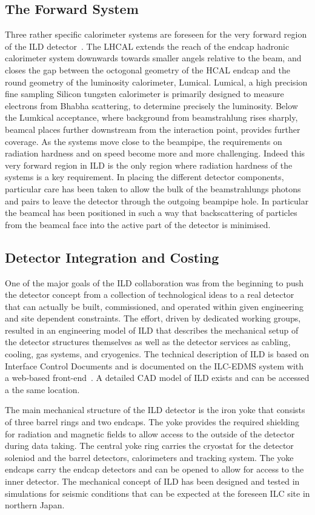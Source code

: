 \documentclass[%
 amsmath,amssymb,
 aps,
]{revtex4-1}
\begin{document}
\subsection{The Forward System}
Three rather specific calorimeter systems are foreseen for the very forward region of the ILD detector~\cite{Abramowicz:2010bg}. The LHCAL extends the reach of the endcap hadronic calorimeter system downwards towards smaller angels relative to the beam, and closes the gap between the octogonal geometry of the HCAL endcap and the round geometry of the luminosity calorimeter, Lumical. Lumical, a high precision fine sampling Silicon tungsten calorimeter is primarily designed to measure electrons from Bhabha scattering, to determine precisely the luminosity. Below the Lumkical acceptance, where background from beamstrahlung rises sharply, beamcal places further downstream from the interaction point, provides further coverage. As the systems move close to the beampipe, the requirements on radiation hardness and on speed become more and more challenging. Indeed this very forward region in ILD is the only region where radiation hardness of the systems is a key requirement. In placing the different detector components, particular care has been taken to allow the bulk of the beamstrahlungs photons and pairs to leave the detector through the outgoing beampipe hole. In particular the beamcal has been positioned in such a way that backscattering of particles from the beamcal face into the active part of the detector is minimised.

\subsection{Detector Integration and Costing}
One of the major goals of the ILD collaboration was from the beginning to push the detector concept from a collection of technological ideas to a real detector that can actually be built, commissioned, and operated within given engineering and site dependent constraints. The effort, driven by dedicated working groups, resulted in an engineering model of ILD that describes the mechanical setup of the detector structures themselves as well as the detector services as cabling, cooling, gas systems, and cryogenics. The technical description of ILD is based on Interface Control Documents and is documented on the ILC-EDMS system with a web-based front-end~\cite{EDMS}. A detailed CAD model of ILD exists and can be accessed a the same location.

The main mechanical structure of the ILD detector is the iron yoke that consists of three barrel rings and two endcaps. The yoke provides the required shielding for radiation and magnetic fields to allow access to the outside of the detector during data taking. The central yoke ring carries the cryostat for the detector soleniod and the barrel detectors, calorimeters and tracking system. The yoke endcaps carry the endcap detectors and can be opened to allow for access to the inner detector. The mechanical concept of ILD has been designed and tested in simulations for seismic conditions that can be expected at the foreseen ILC site in northern Japan.
\end{document}
